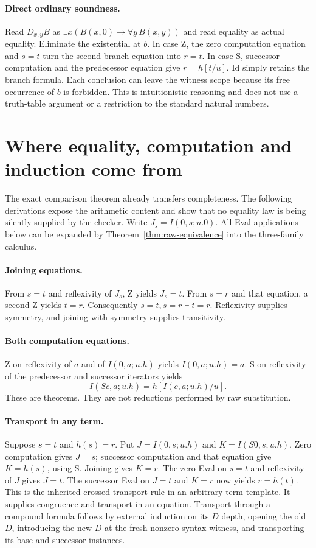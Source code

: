 \documentclass[11pt,letterpaper]{article}
\theoremstyle{definition}\newtheorem{definition}[theorem]{Definition}
\theoremstyle{remark}\newtheorem{remark}[theorem]{Remark}
\begin{document}
\paragraph{Direct ordinary soundness.}
Read $D_{x,y}B$ as
$\exists x(B(x,0)\to\forall y\,B(x,y))$ and read equality as actual
equality. Eliminate the existential at $b$. In case Z, the zero computation
equation and $s=t$ turn the second branch equation into $r=t$.
In case S, successor computation and the predecessor equation give
$r=h[t/u]$. Id simply retains the branch formula. Each conclusion can
leave the witness scope because its free occurrence of $b$ is forbidden.
This is intuitionistic reasoning and does not use a truth-table argument
or a restriction to the standard natural numbers.

\section{Where equality, computation and induction come from}
\label{sec:bootstrap}

The exact comparison theorem already transfers completeness. The following
derivations expose the arithmetic content and show that no equality law is
being silently supplied by the checker. Write
$J_s=I(0,s;u.0)$. All Eval applications below can be expanded by
Theorem~\ref{thm:raw-equivalence} into the three-family calculus.

\paragraph{Joining equations.}
From $s=t$ and reflexivity of $J_s$, Z yields $J_s=t$.
From $s=r$ and that equation, a second Z yields $t=r$.
Consequently $s=t,s=r\vdash t=r$. Reflexivity supplies symmetry, and
joining with symmetry supplies transitivity.

\paragraph{Both computation equations.}
Z on reflexivity of $a$ and of $I(0,a;u.h)$ yields
$I(0,a;u.h)=a$. S on reflexivity of the predecessor and successor
iterators yields
\[
           I(Sc,a;u.h)=h[I(c,a;u.h)/u].
\]
These are theorems. They are not reductions performed by raw substitution.

\paragraph{Transport in any term.}
Suppose $s=t$ and $h(s)=r$. Put
$J=I(0,s;u.h)$ and $K=I(S0,s;u.h)$.
Zero computation gives $J=s$; successor computation and that equation
give $K=h(s)$, using S. Joining gives $K=r$.
The zero Eval on $s=t$ and reflexivity of $J$ gives $J=t$.
The successor Eval on $J=t$ and $K=r$ now yields $r=h(t)$.
This is the inherited crossed transport rule in an arbitrary term template.
It supplies congruence and transport in an equation. Transport through a
compound formula follows by external induction on its $D$ depth, opening
the old $D$, introducing the new $D$ at the fresh nonzero-syntax witness,
and transporting its base and successor instances.
\end{document}
